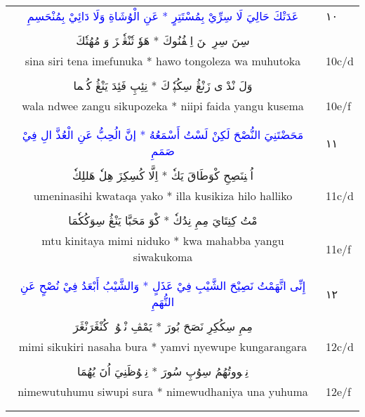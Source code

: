 \documentclass[a4paper, 10pt]{report}
\begin{document}
\begin{longtable}{cl}
\textcolor{blue}{\textarabic{عَدَتْكَ حَالِيَ لَا سِرِّيْ بِمُسْتَتِرٍ * عَنِ الْوُشَاةِ وَلَا دَائِيْ بِمُنْحَسِمِ}} & \textarabic{١٠} \\* 
\E{ } & \\[2mm] 
\textcolor{mygreen}{\textarabic{سِنَ سِرِ تٖنَ اِمٖفُنُوكَ * هَوٗ تٗنْڠٗلٖزَ وَ مُهُتٗكَ}} &  \\* 
sina siri tena imefunuka * hawo tongoleza wa muhutoka & 10c/d \\* 
\E{ } & \\[2mm] 
\textcolor{mygreen}{\textarabic{وَلَ نْدْوٖى زَنْڠُ سِكُپٗزٖكَ * نِئِپِ فَئِدَ يَنْڠُ كُسٖما}} &  \\* 
wala ndwee zangu sikupozeka * niipi faida yangu kusema & 10e/f \\* 
\E{ } & \\[2mm] 
\\[6mm] 

\textcolor{blue}{\textarabic{مَحَضْتَنِيَ النُّصْحَ لَكِنْ لَسْتُ أَسْمَعُهُ * إنَّ الُحِبُّ عَنِ الْعُذَّ الِ فِيْ صَمَمِ}} & \textarabic{١١} \\* 
\E{ } & \\[2mm] 
\textcolor{mygreen}{\textarabic{اُمٖنِنَصِحِ كْوَطَاقَ يَكٗ * اِلَّا كُسِكِزَ هِلٗ هَللِكٗ}} &  \\* 
umeninasihi kwataqa yako * illa kusikiza hilo halliko & 11c/d \\* 
\E{ } & \\[2mm] 
\textcolor{mygreen}{\textarabic{مْتُ كِنِتَايَ مِمِ نِدُكٗ * كْوَ مَحَبَّا يَنْڠُ سِوَكُكٗمَا}} &  \\* 
mtu kinitaya mimi niduko * kwa mahabba yangu siwakukoma & 11e/f \\* 
\E{ } & \\[2mm] 
\\[6mm] 

\textcolor{blue}{\textarabic{إِنِّى اتَّهَمْتُ نَصِيْحَ الشَّيْبِ فِيْ عَذَلٍ * وَالشَّيْبُ أَبْعَدُ فِيْ نُصْحٍ عَنِ التُّهَمِ}} & \textarabic{١٢} \\* 
\E{ } & \\[2mm] 
\textcolor{mygreen}{\textarabic{مِمِ سِكُكِرِ نَصَحَ بُورَ * يَمْڤِ نْيٖوُپٖ كُنْڠَرَنْڠَرَ}} &  \\* 
mimi sikukiri nasaha bura * yamvi nyewupe kungarangara & 12c/d \\* 
\E{ } & \\[2mm] 
\textcolor{mygreen}{\textarabic{نِمٖووتُهُمُ سِوُپِ سُورَ * نِمٖوُظَنِيَ اُنَ يُهُمَا}} &  \\* 
nimewutuhumu siwupi sura * nimewudhaniya una yuhuma & 12e/f \\* 
\E{ } & \\[2mm] 
\\[6mm] 


\end{longtable}
\end{document}
